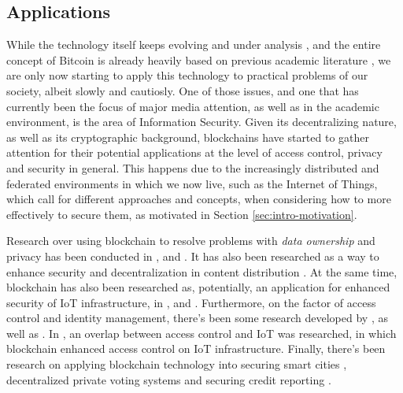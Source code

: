 \subsection{Applications}

While the technology itself keeps evolving and under analysis \cite{eyal_bitcoin-ng:_2016, wang_research_2018, gervais_security_2016, lin_survey_2017}, and the entire concept of Bitcoin is already heavily based on previous academic literature \cite{narayanan_bitcoins_2017}, we are only now starting to apply this technology to practical problems of our society, albeit slowly and cautiosly. One of those issues, and one that has currently been the focus of major media attention, as well as in the academic environment, is the area of Information Security. Given its decentralizing nature, as well as its cryptographic background, blockchains have started to gather attention for their potential applications at the level of access control, privacy and security in general. This happens due to the increasingly distributed and federated environments in which we now live, such as the Internet of Things, which call for different approaches and concepts, when considering how to more effectively to secure them, as motivated in Section \ref{sec:intro-motivation}.

Research over using blockchain to resolve problems with \textit{data ownership} and privacy has been conducted in \cite{zyskind_decentralizing_2015}, \cite{liang_provchain:_2017} and \cite{yue_healthcare_2016}. It has also been researched as a way to enhance security and decentralization in content distribution \cite{fotiou_decentralized_2016}. At the same time, blockchain has also been researched as, potentially, an application for enhanced security of IoT infrastructure, in \cite{dorri_blockchain_2016}, \cite{dorri_blockchain_2017} and \cite{ouaddah_access_2017}. Furthermore, on the factor of access control and identity management, there's been some research developed by \citeauthor{augot_identity_2017} \cite{augot_identity_2017}, as well as \citeauthor{maesa_blockchain_2017} \cite{maesa_blockchain_2017}. In \cite{ouaddah_fairaccess:_2017}, an overlap between access control and IoT was researched, in which blockchain enhanced access control on IoT infrastructure. Finally, there's been research on applying blockchain technology into securing smart cities \cite{biswas_securing_2016}, decentralized private voting systems \cite{sheer_hardwick_e-voting_2018} and securing credit reporting \cite{kafshdar_goharshady_secure_2018}.


